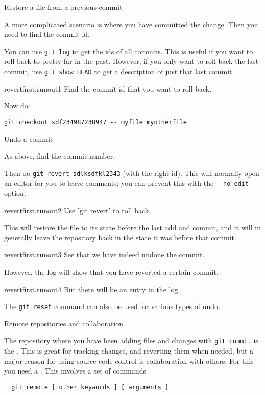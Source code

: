 \newpage
{} {Restore a file from a previous commit}

A more complicated scenario is where you have committed the change.
Then you need to find the commit id.

You can use \lstinline{git log} to get the ids of all commits.
This is useful if you want to roll back to pretty far in the past.
However, if you only want to roll back the last commit,
use \lstinline{git show HEAD} to get a description of just that last commit.

\begin{gitstep}{revertfirst.runout1}
  Find the commit id that you want to roll back.
\end{gitstep}

Now do:
\begin{lstlisting}
git checkout sdf234987238947 -- myfile myotherfile
\end{lstlisting}

\newpage
{} {Undo a commit}

As above, find the commit number.

Then do \lstinline{git revert sdlksdfkl2343} (with the right id).
This will normally open an editor for you to leave comments;
you can prevent this with the \lstinline{--no-edit} option.

\begin{gitstep}{revertfirst.runout2}
  Use 'git revert' to roll back.
\end{gitstep}

This will restore the file to its state before the last
add and commit, and it will in generally leave the repository back
in the state it was before that commit.

\begin{gitstep}{revertfirst.runout3}
  See that we have indeed undone the commit.
\end{gitstep}

However, the log will show that you have reverted a certain commit.

\begin{gitstep}{revertfirst.runout4}
  But there will be an entry in the log.
\end{gitstep}

The \lstinline{git reset} command can also be used for various
types of undo.

\newpage
{} {Remote repositories and collaboration}
\label{sec:git-remote}

The repository where you have been adding files and changes with
\lstinline{git commit} is the .
This is great for tracking changes, and reverting them when needed,
but a major reason for using source code control is collaboration
with others.
For this you need a .
This involves a set of commands
\begin{lstlisting}
  git remote [ other keywords ] [ arguments ]
\end{lstlisting}

